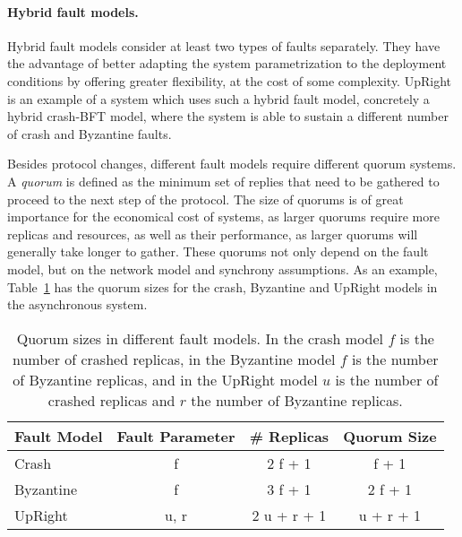 \paragraph{Hybrid fault models.}
Hybrid fault models consider at least two types of faults
separately. They have the advantage of better adapting the
system parametrization to the deployment conditions by offering
greater flexibility, at the cost of some complexity.
UpRight~\cite{upright} is an example of a system which uses such
a hybrid fault model, concretely a hybrid crash-\ac{BFT} model, where
the system is able to sustain a different number of crash and
Byzantine faults. 

Besides protocol changes, different fault models require
different quorum systems. A \emph{quorum} is defined as the
minimum set of replies that need to be gathered to proceed to the
next step of the protocol. The size of quorums is of great
importance for the economical cost of systems, as larger quorums require
more replicas and resources, as well as their performance, as
larger quorums will generally take longer to gather. These
quorums not only depend on the fault model, but on the network
model and synchrony assumptions. As an example,
Table~\ref{tab:quorum} has the quorum sizes for the crash,
Byzantine and UpRight models in the asynchronous system.

\begin{table}[ht]
    \centering
    \caption{Quorum sizes in different fault models. In the crash
    model $f$ is the number of crashed replicas, in the Byzantine
    model $f$ is the number of Byzantine replicas, and in the
    UpRight model $u$ is the number of crashed replicas and $r$
    the number of Byzantine replicas.}
    \begin{tabular}{|l|c|c|c|}
        \hline
        \textbf{Fault Model} & \textbf{Fault Parameter} & \textbf{\# Replicas} & \textbf{Quorum Size} \\
        \hline
        Crash & f & 2 f + 1 & f + 1 \\
        \hline
        Byzantine & f & 3 f + 1 & 2 f + 1 \\
        \hline
        UpRight & u, r & 2 u + r + 1 & u + r + 1 \\
        \hline
    \end{tabular}\label{tab:quorum}
\end{table}

